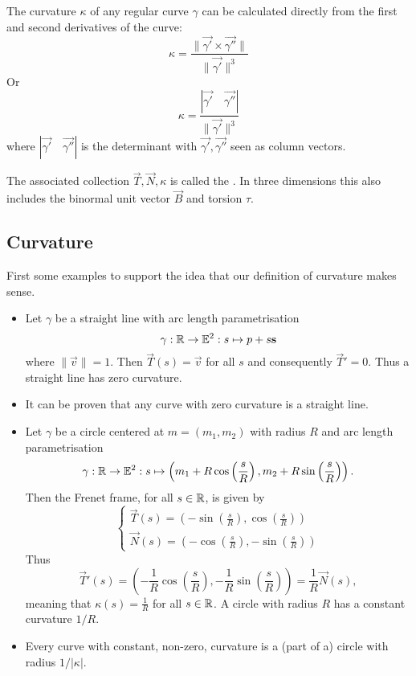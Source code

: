 The curvature $\kappa$ of any regular curve $\gamma$ can be calculated directly from the first and second derivatives of the curve:
\[ \kappa = \frac{\lVert \vec{\gamma'} \times \vec{\gamma''}\lVert}{\lVert\vec{\gamma'}\lVert^3} \]
Or
\[ \kappa = \frac{| \vec{\gamma'} \quad \vec{\gamma''}|}{\lVert\vec{\gamma'}\lVert^3} \]
where $| \vec{\gamma'} \quad \vec{\gamma''}|$ is the determinant with $\vec{\gamma'},\vec{\gamma''}$ seen as column vectors.

The associated collection $\vec{T}, \vec{N}, \kappa$ is called the . In three dimensions this also includes the binormal unit vector $\vec{B}$ and torsion $\tau$.

\subsection{Curvature}
First some examples to support the idea that our definition of curvature makes sense.
\begin{example}
\begin{itemize}
\item Let $\gamma$ be a straight line with arc length parametrisation
\[ \gamma: \mathbb{R} \to \mathbb{E}^2: s\mapsto p + s \bm{\mathrm{s}} \]
where $\lVert \vec{v}\lVert = 1$. Then $\vec{T}(s) = \vec{v}$ for all $s$ and consequently $\vec{T}' = 0$. Thus a straight line has zero curvature.
\item It can be proven that any curve with zero curvature is a straight line.
\item Let $\gamma$ be a circle centered at $m= (m_1,m_2)$ with radius $R$ and arc length parametrisation
\[ \gamma: \mathbb{R} \to \mathbb{E}^2: s\mapsto \left(m_1 + R\cos \left(\frac{s}{R}\right), m_2 + R\sin \left(\frac{s}{R}\right)\right). \]
Then the Frenet frame, for all $s\in\mathbb{R}$, is given by
\[ \begin{cases}
\vec{T}(s) = \left(-\sin \left(\frac{s}{R}\right), \cos \left(\frac{s}{R}\right)\right) \\
\vec{N}(s) = \left(-\cos \left(\frac{s}{R}\right), -\sin \left(\frac{s}{R}\right)\right)
\end{cases} \]
Thus
\[ \vec{T}'(s) = \left(- \frac{1}{R}\cos \left(\frac{s}{R}\right), - \frac{1}{R}\sin \left(\frac{s}{R}\right)\right) = \frac{1}{R} \vec{N}(s), \]
meaning that $\kappa(s) = \frac{1}{R}$ for all $s\in \mathbb{R}$. A circle with radius $R$ has a constant curvature $1/R$.
\item Every curve with constant, non-zero, curvature is a (part of a) circle with radius $1/|\kappa|$.
\end{itemize}
\end{example}
